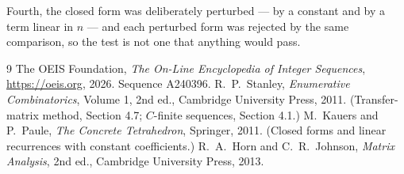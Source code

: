 \documentclass[11pt,a4paper]{article}
\theoremstyle{plain}
\theoremstyle{definition}
\begin{document}
Fourth, the closed form was deliberately perturbed --- by a constant and by a term linear in
$n$ --- and each perturbed form was rejected by the same comparison, so the test is not one
that anything would pass.

\begin{thebibliography}{9}
 The OEIS Foundation, \emph{The On-Line Encyclopedia of Integer
Sequences}, \url{https://oeis.org}, 2026. Sequence A240396.
 R.~P.~Stanley, \emph{Enumerative Combinatorics}, Volume 1, 2nd ed.,
Cambridge University Press, 2011. (Transfer-matrix method, Section 4.7; $C$-finite sequences,
Section 4.1.)
 M.~Kauers and P.~Paule, \emph{The Concrete Tetrahedron}, Springer, 2011.
(Closed forms and linear recurrences with constant coefficients.)
 R.~A.~Horn and C.~R.~Johnson, \emph{Matrix Analysis}, 2nd ed., Cambridge
University Press, 2013.
\end{thebibliography}
\end{document}
